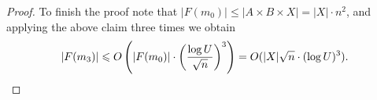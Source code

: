 \documentclass{theoretics}
\begin{document}
\begin{proof}
To finish the proof note that $|F(m_0)| \leqslant |A \times B \times X| = |X| \cdot n^2$, and applying the above claim three times we obtain
\[|F(m_3)| \leqslant O\left(|F(m_0)| \cdot \left(\frac{\log U}{\sqrt n}\right)^3\right) = O(|X| \sqrt{n} \cdot (\log U)^3).\qedhere\]
\end{proof}


\printbibliography
\end{document}
